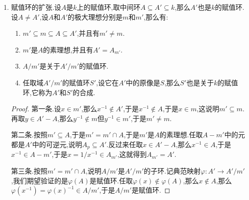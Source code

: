 \begin{enumerate}
\begin{enumerate}[(1)]
\begin{proof}
    		设$A$是关于$k$的赋值环,任取$x\in k$是$A$上整元,也即有等式$x^n+r_1x^{n-1}+\cdots+r_n=0$,其中$r_i\in A$.倘若$x\in A$那没什么需要证的,倘若$x^{-1}\in A$那么有$x=-(r_1+r_2x^{-1}+\cdots+r_nx^{1-n})\in A$,这说明了正规性.
    	\end{proof}
    	\item 赋值环$A$上的所有有限生成理想都是主理想(满足这个条件的整环称为Bezout环).于是诺特赋值环必然是一个PID.
    	\begin{proof}
    		
    		按照归纳法,只需证明理想$(a_1,a_2)$是主理想,但是我们解释过$(a_1)\subseteq (a_2)$和$(a_2)\subseteq (a_1)$必然有一个成立,于是$(a_1,a_2)=(a_1)$或者$(a_2)$.
    	\end{proof}
    	\item Remark.一般赋值环未必只有两个素理想,但是DVR一定只有两个素理想.
    \end{enumerate}
    \item 赋值环的扩张.设$A$是$k$上的赋值环,取中间环$A\subseteq A'\subseteq k$,那么$A'$也是$k$的赋值环.设$A\not=A'$,设$A$和$A'$的极大理想分别是$m$和$m'$,那么有:
    \begin{enumerate}[(1)]
    	\item $m'\subseteq m\subseteq A\subseteq A'$,并且有$m'\not=m$.
    	\item $m'$是$A$的素理想,并且有$A'=A_{m'}$.
    	\item $A/m'$是关于$A'/m'$的赋值环.
    	\item 任取域$A'/m'$的赋值环$S'$,设它在$A'$中的原像是$S$,那么$S'$也是关于$k$的赋值环,它称为$A'$和$S'$的合成.
    \end{enumerate}
    \begin{proof}
    	
    	第一条.设$x\in m'$,那么$x^{-1}\not\in A'$,于是$x^{-1}\not\in A$,于是$x\in m$,这说明$m'\subseteq m$.再取$y\in A'-A$,那么$y^{-1}\not\in m$但$y^{-1}\in m'$,于是$m'\not=m$.
    	
    	第二条.按照$m'\subseteq A$,于是$m'=m'\cap A$,于是$m'$是$A$的素理想.任取$A-m'$中的元都是$A'$中的可逆元,说明$A_p\subseteq A'$.反过来任取$x\in A'-A$,那么$x^{-1}\in A$,于是$x^{-1}\in A-m'$,于是$x=1/x^{-1}\in A_{m'}$,这就得到$A_{m'}=A'$.
    	
    	第三条.按照$m'=m'\cap A$,说明$A/m'$是$A'/m'$的子环.记典范映射$\varphi:A'\to A'/m'$,我们期望验证的是$\varphi(A)$是赋值环.任取$\varphi(x)\not\in\varphi(A)$,那么$x\not\in A$,那么$\varphi(x^{-1})=\varphi(x)^{-1}\in A/m'$,于是$A/m'$是赋值环.
    	

\end{proof}
\end{enumerate}
